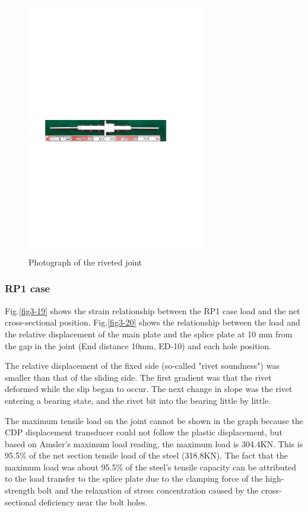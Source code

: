 \begin{figure}[htbp]
    \centering
    \includegraphics[width=0.7\textwidth]{imgs/ch3/fig3-18.pdf}
    \caption{Photograph of the riveted joint}
    \label{fig3-18}
\end{figure}


\subsubsection{RP1 case}

Fig.\ref{fig3-19} shows the strain relationship between the RP1 case load and the net cross-sectional position. Fig.\ref{fig3-20} shows the relationship between the load and the relative displacement of the main plate and the splice plate at 10 mm from the gap in the joint (End distance 10mm, ED-10) and each hole position.

The relative displacement of the fixed side (so-called "rivet soundness") was smaller than that of the sliding side. The first gradient was that the rivet deformed while the slip began to occur. The next change in slope was the rivet entering a bearing state, and the rivet bit into the bearing little by little.

The maximum tensile load on the joint cannot be shown in the graph because the CDP displacement transducer could not follow the plastic displacement, but based on Amsler's maximum load reading, the maximum load is 304.4KN. This is 95.5\% of the net section tensile load of the steel (318.8KN). The fact that the maximum load was about 95.5\% of the steel's tensile capacity can be attributed to the load transfer to the splice plate due to the clamping force of the high-strength bolt and the relaxation of stress concentration caused by the cross-sectional deficiency near the bolt holes.

